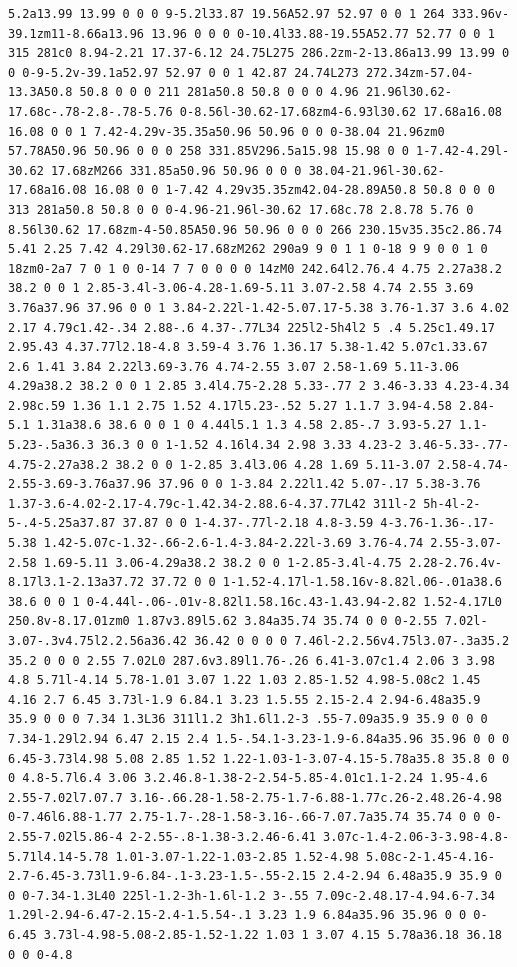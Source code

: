 \documentclass[11pt]{article}
\begin{document}
\begin{enumerate}
\begin{verbatim}
5.2a13.99 13.99 0 0 0 9-5.2l33.87 19.56A52.97 52.97 0 0 1 264 333.96v-39.1zm11-8.66a13.96 13.96 0 0 0 0-10.4l33.88-19.55A52.77 52.77 0 0 1 315 281c0 8.94-2.21 17.37-6.12 24.75L275 286.2zm-2-13.86a13.99 13.99 0 0 0-9-5.2v-39.1a52.97 52.97 0 0 1 42.87 24.74L273 272.34zm-57.04-13.3A50.8 50.8 0 0 0 211 281a50.8 50.8 0 0 0 4.96 21.96l30.62-17.68c-.78-2.8-.78-5.76 0-8.56l-30.62-17.68zm4-6.93l30.62 17.68a16.08 16.08 0 0 1 7.42-4.29v-35.35a50.96 50.96 0 0 0-38.04 21.96zm0 57.78A50.96 50.96 0 0 0 258 331.85V296.5a15.98 15.98 0 0 1-7.42-4.29l-30.62 17.68zM266 331.85a50.96 50.96 0 0 0 38.04-21.96l-30.62-17.68a16.08 16.08 0 0 1-7.42 4.29v35.35zm42.04-28.89A50.8 50.8 0 0 0 313 281a50.8 50.8 0 0 0-4.96-21.96l-30.62 17.68c.78 2.8.78 5.76 0 8.56l30.62 17.68zm-4-50.85A50.96 50.96 0 0 0 266 230.15v35.35c2.86.74 5.41 2.25 7.42 4.29l30.62-17.68zM262 290a9 9 0 1 1 0-18 9 9 0 0 1 0 18zm0-2a7 7 0 1 0 0-14 7 7 0 0 0 0 14zM0 242.64l2.76.4 4.75 2.27a38.2 38.2 0 0 1 2.85-3.4l-3.06-4.28-1.69-5.11 3.07-2.58 4.74 2.55 3.69 3.76a37.96 37.96 0 0 1 3.84-2.22l-1.42-5.07.17-5.38 3.76-1.37 3.6 4.02 2.17 4.79c1.42-.34 2.88-.6 4.37-.77L34 225l2-5h4l2 5 .4 5.25c1.49.17 2.95.43 4.37.77l2.18-4.8 3.59-4 3.76 1.36.17 5.38-1.42 5.07c1.33.67 2.6 1.41 3.84 2.22l3.69-3.76 4.74-2.55 3.07 2.58-1.69 5.11-3.06 4.29a38.2 38.2 0 0 1 2.85 3.4l4.75-2.28 5.33-.77 2 3.46-3.33 4.23-4.34 2.98c.59 1.36 1.1 2.75 1.52 4.17l5.23-.52 5.27 1.1.7 3.94-4.58 2.84-5.1 1.31a38.6 38.6 0 0 1 0 4.44l5.1 1.3 4.58 2.85-.7 3.93-5.27 1.1-5.23-.5a36.3 36.3 0 0 1-1.52 4.16l4.34 2.98 3.33 4.23-2 3.46-5.33-.77-4.75-2.27a38.2 38.2 0 0 1-2.85 3.4l3.06 4.28 1.69 5.11-3.07 2.58-4.74-2.55-3.69-3.76a37.96 37.96 0 0 1-3.84 2.22l1.42 5.07-.17 5.38-3.76 1.37-3.6-4.02-2.17-4.79c-1.42.34-2.88.6-4.37.77L42 311l-2 5h-4l-2-5-.4-5.25a37.87 37.87 0 0 1-4.37-.77l-2.18 4.8-3.59 4-3.76-1.36-.17-5.38 1.42-5.07c-1.32-.66-2.6-1.4-3.84-2.22l-3.69 3.76-4.74 2.55-3.07-2.58 1.69-5.11 3.06-4.29a38.2 38.2 0 0 1-2.85-3.4l-4.75 2.28-2.76.4v-8.17l3.1-2.13a37.72 37.72 0 0 1-1.52-4.17l-1.58.16v-8.82l.06-.01a38.6 38.6 0 0 1 0-4.44l-.06-.01v-8.82l1.58.16c.43-1.43.94-2.82 1.52-4.17L0 250.8v-8.17.01zm0 1.87v3.89l5.62 3.84a35.74 35.74 0 0 0-2.55 7.02l-3.07-.3v4.75l2.2.56a36.42 36.42 0 0 0 0 7.46l-2.2.56v4.75l3.07-.3a35.2 35.2 0 0 0 2.55 7.02L0 287.6v3.89l1.76-.26 6.41-3.07c1.4 2.06 3 3.98 4.8 5.71l-4.14 5.78-1.01 3.07 1.22 1.03 2.85-1.52 4.98-5.08c2 1.45 4.16 2.7 6.45 3.73l-1.9 6.84.1 3.23 1.5.55 2.15-2.4 2.94-6.48a35.9 35.9 0 0 0 7.34 1.3L36 311l1.2 3h1.6l1.2-3 .55-7.09a35.9 35.9 0 0 0 7.34-1.29l2.94 6.47 2.15 2.4 1.5-.54.1-3.23-1.9-6.84a35.96 35.96 0 0 0 6.45-3.73l4.98 5.08 2.85 1.52 1.22-1.03-1-3.07-4.15-5.78a35.8 35.8 0 0 0 4.8-5.7l6.4 3.06 3.2.46.8-1.38-2-2.54-5.85-4.01c1.1-2.24 1.95-4.6 2.55-7.02l7.07.7 3.16-.66.28-1.58-2.75-1.7-6.88-1.77c.26-2.48.26-4.98 0-7.46l6.88-1.77 2.75-1.7-.28-1.58-3.16-.66-7.07.7a35.74 35.74 0 0 0-2.55-7.02l5.86-4 2-2.55-.8-1.38-3.2.46-6.41 3.07c-1.4-2.06-3-3.98-4.8-5.71l4.14-5.78 1.01-3.07-1.22-1.03-2.85 1.52-4.98 5.08c-2-1.45-4.16-2.7-6.45-3.73l1.9-6.84-.1-3.23-1.5-.55-2.15 2.4-2.94 6.48a35.9 35.9 0 0 0-7.34-1.3L40 225l-1.2-3h-1.6l-1.2 3-.55 7.09c-2.48.17-4.94.6-7.34 1.29l-2.94-6.47-2.15-2.4-1.5.54-.1 3.23 1.9 6.84a35.96 35.96 0 0 0-6.45 3.73l-4.98-5.08-2.85-1.52-1.22 1.03 1 3.07 4.15 5.78a36.18 36.18 0 0 0-4.8 
\end{verbatim}
\end{enumerate}
\end{document}
